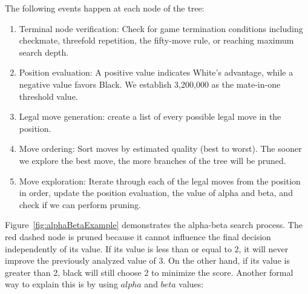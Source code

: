 The following events happen at each node of the tree:


\begin{enumerate}
    \item Terminal node verification: Check for game termination conditions including checkmate, threefold repetition, the fifty-move rule, or reaching maximum search depth.
    \item Position evaluation: A positive value indicates White's advantage, while a negative value favors Black. We establish 3,200,000 as the mate-in-one threshold value.
    \item Legal move generation: create a list of every possible legal move in the position.
    \item Move ordering: Sort moves by estimated quality (best to worst). The sooner we explore the best move, the more branches of the tree will be pruned.
    \item Move exploration: Iterate through each of the legal moves from the position in order, update the position evaluation, the value of alpha and beta, and check if we can perform pruning.
\end{enumerate}

\vspace{4em}

\noindent Figure~\ref{fig:alphaBetaExample} demonstrates the alpha-beta search process. The red dashed node is pruned because it cannot influence the final decision independently of its value. If its value is less than or equal to 2, it will never improve the previously analyzed value of 3. On the other hand, if its value is greater than 2, black will still choose 2 to minimize the score. Another formal way to explain this is by using $alpha$ and $beta$ values:

\newpage

